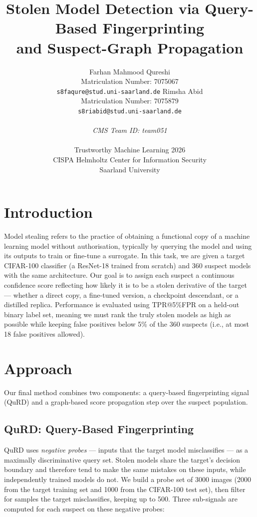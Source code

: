 \documentclass{article} %
\title{Stolen Model Detection via Query-Based Fingerprinting\\and Suspect-Graph Propagation}
\author{
Farhan Mahmood Qureshi\\
Matriculation Number: 7075067\\
\texttt{s8faqure@stud.uni-saarland.de}
\And
Rimsha Abid\\
Matriculation Number: 7075879\\
\texttt{s8riabid@stud.uni-saarland.de}\\
\\
\textit{CMS Team ID: team051}\\
\\
Trustworthy Machine Learning 2026\\
CISPA Helmholtz Center for Information Security\\
Saarland University
}
\begin{document}
\maketitle

\section{Introduction}

Model stealing refers to the practice of obtaining a functional copy of a machine learning model without authorisation, typically by querying the model and using its outputs to train or fine-tune a surrogate. In this task, we are given a target CIFAR-100 classifier (a ResNet-18 trained from scratch) and 360 suspect models with the same architecture. Our goal is to assign each suspect a continuous confidence score reflecting how likely it is to be a stolen derivative of the target — whether a direct copy, a fine-tuned version, a checkpoint descendant, or a distilled replica. Performance is evaluated using TPR@5\%FPR on a held-out binary label set, meaning we must rank the truly stolen models as high as possible while keeping false positives below 5\% of the 360 suspects (i.e., at most 18 false positives allowed).

\section{Approach}

Our final method combines two components: a query-based fingerprinting signal (QuRD) and a graph-based score propagation step over the suspect population.

\subsection{QuRD: Query-Based Fingerprinting}

QuRD \citep{bourtoule2024queries} uses \emph{negative probes} — inputs that the target model misclassifies — as a maximally discriminative query set. Stolen models share the target's decision boundary and therefore tend to make the same mistakes on these inputs, while independently trained models do not. We build a probe set of 3000 images (2000 from the target training set and 1000 from the CIFAR-100 test set), then filter for samples the target misclassifies, keeping up to 500. Three sub-signals are computed for each suspect on these negative probes:
\end{document}
